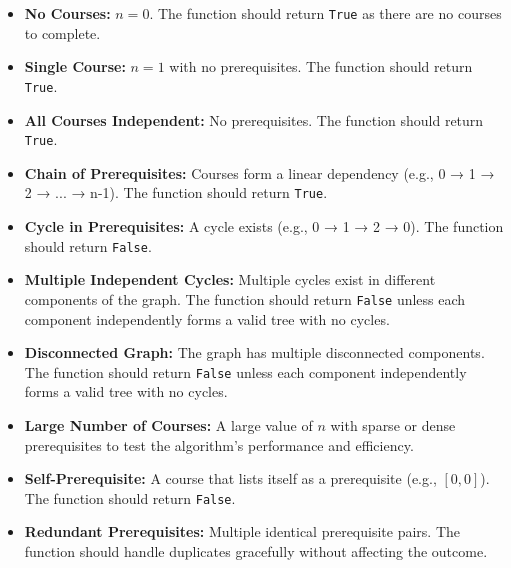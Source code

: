 \begin{itemize}
    \item \textbf{No Courses:} \( n = 0 \). The function should return \texttt{True} as there are no courses to complete.
    
    \item \textbf{Single Course:} \( n = 1 \) with no prerequisites. The function should return \texttt{True}.
    
    \item \textbf{All Courses Independent:} No prerequisites. The function should return \texttt{True}.
    
    \item \textbf{Chain of Prerequisites:} Courses form a linear dependency (e.g., 0 → 1 → 2 → ... → n-1). The function should return \texttt{True}.
    
    \item \textbf{Cycle in Prerequisites:} A cycle exists (e.g., 0 → 1 → 2 → 0). The function should return \texttt{False}.
    
    \item \textbf{Multiple Independent Cycles:} Multiple cycles exist in different components of the graph. The function should return \texttt{False} unless each component independently forms a valid tree with no cycles.
    
    \item \textbf{Disconnected Graph:} The graph has multiple disconnected components. The function should return \texttt{False} unless each component independently forms a valid tree with no cycles.
    
    \item \textbf{Large Number of Courses:} A large value of \( n \) with sparse or dense prerequisites to test the algorithm's performance and efficiency.
    
    \item \textbf{Self-Prerequisite:} A course that lists itself as a prerequisite (e.g., \([0, 0]\)). The function should return \texttt{False}.
    
    \item \textbf{Redundant Prerequisites:} Multiple identical prerequisite pairs. The function should handle duplicates gracefully without affecting the outcome.
\end{itemize}

\printindex